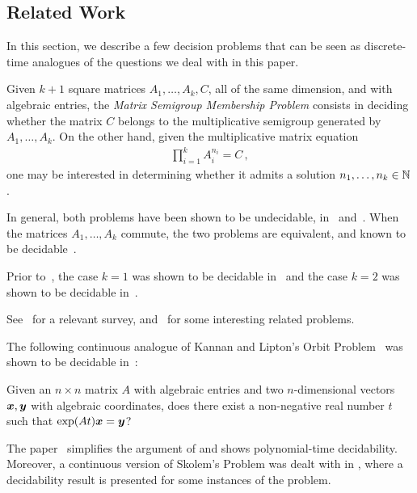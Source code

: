 \subsection{Related Work}
\label{sec:lics_related_work}

In this section, we describe a few decision problems that can be seen as discrete-time analogues of the questions we deal with in this paper.

Given $k+1$ square matrices $A_{1}, \ldots, A_{k}, C$, all of the same dimension, and with algebraic entries, the \emph{Matrix Semigroup Membership Problem} consists in deciding whether the matrix $C$ belongs to the multiplicative semigroup generated by $A_{1}, \ldots, A_{k}$.
On the other hand, given the multiplicative matrix equation
\begin{align*}
\prod\limits_{i=1}^{k} A_{i}^{n_{i}} = C \, ,
\end{align*}
one may be interested in determining whether it admits a solution $n_{1}, \ldots, n_{k} \in \mathbb{N}$.

In general, both problems have been shown to be undecidable, in~\cite{Paterson} and~\cite{MEHTP}.
When the matrices $A_{1}, \ldots, A_{k}$ commute, the two problems are
equivalent, and known to be decidable~\cite{MultiplicativeMatrixEquations}.

Prior to~\cite{MultiplicativeMatrixEquations}, the case $k=1$ was shown to be decidable in~\cite{KL86} and the case $k=2$ was shown to be decidable in~\cite{ABC}.

See~\cite{HalavaSurvey} for a relevant survey, and~\cite{CK05} for
some interesting related problems.

The following continuous analogue of Kannan and Lipton's Orbit
Problem~\cite{KL86} was shown to be decidable in~\cite{Hainry08}:

\begin{definition}
Given an $n \times n$ matrix $A$ with algebraic entries and two
$n$-dimensional vectors $\boldsymbol{x}, \boldsymbol{y}$ with
algebraic coordinates, does there exist a non-negative real number $t$ such
that $\exp(At) \boldsymbol{x} = \boldsymbol{y}$?
\end{definition}

The paper~\cite{ContinuousOrbitIPL} simplifies the argument of
\cite{Hainry08} and shows polynomial-time decidability. Moreover, a
continuous version of Skolem's Problem was dealt with in
\cite{ContinuousSkolem}, where a decidability result is presented for
some instances of the problem.

